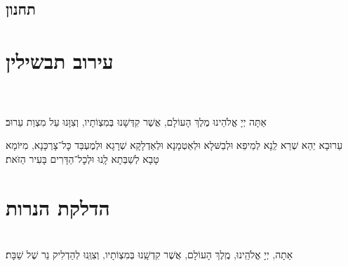 \documentclass[twoside, openany, parskip=half, 11pt]{book}
\begin{document}

\avinumalkeinu

\vfill
{}\\

\section[תחנון]{ תחנון }


\nefilasapayim

\shomeryisroel

\fullkaddish

\label{mincha aleinu}

\aleinu
\mournerskaddish

\vfill

\quad{}\quad{}

\chapter[עירוב תבשילין]{ עירוב תבשילין }

\\
\\
אַתָּה יְיָ אֱלֹהֵינוּ מֶלֶךְ הָעוֹלָם, אֲשֶׁר קִדְּשָׁנוּ בְּמִצְוֹתָיו, וְצִוָּנוּ עַל מִצְוַת עֵרוּב׃

עֵרוּבָא יְהֵא שְׁרֵא לַֽנָא לְמֵיפֵא וּלְבַשּּׁלָא וּלְאַטְמָנָא וּלְאַדְלָקָא שְׁרָגָא וּלְמֶעְבַּד כׇּל־צָרְכָּנָא, מִיּוֹמָא טָבָא לְשַׁבְּתָא לָֽנוּ וּלְכׇל־הַדָּרִים בָּעִיר הַזּׂאת׃‏


\vspace{\baselineskip}
{\let\clearpage\relax
\chapter[הדלקת הנרות שבת ויום טוב]{ הדלקת הנרות }}

\\
אַתָה, יְיָ אֱלֹהֵֽינוּ, מֶֽלֶךְ הָעוֹלָם, אֲשֶׁר קִדְשָֽׁנוּ בְּמִצְוֹתָיו, וְצִוְּֽנוּ לְהַדְלִיק נֵר שֶׁל שַׁבָּת׃
\end{document}
